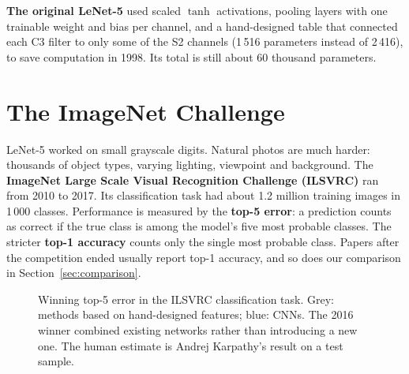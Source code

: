 \documentclass[12pt, a4paper]{article}
\begin{document}
\begin{notebox}
  \textbf{The original LeNet-5} used scaled $\tanh$ activations, pooling
  layers with one trainable weight and bias per channel, and a hand-designed
  table that connected each C3 filter to only some of the S2 channels
  (1\,516 parameters instead of 2\,416), to save computation in 1998.
  Its total is still about 60 thousand parameters.
\end{notebox}

\section{The ImageNet Challenge}

LeNet-5 worked on small grayscale digits. Natural photos are much harder:
thousands of object types, varying lighting, viewpoint and background.
The \textbf{ImageNet Large Scale Visual Recognition Challenge (ILSVRC)} ran
from 2010 to 2017. Its classification task had about 1.2 million training
images in 1\,000 classes. Performance is measured by the \textbf{top-5 error}:
a prediction counts as correct if the true class is among the model's five
most probable classes. The stricter \textbf{top-1 accuracy} counts only the
single most probable class. Papers after the competition ended usually report
top-1 accuracy, and so does our comparison in Section~\ref{sec:comparison}.

\begin{figure}[H]
  \centering
  \caption{Winning top-5 error in the ILSVRC classification task. Grey: methods
    based on hand-designed features; blue: CNNs. The 2016 winner combined
    existing networks rather than introducing a new one. The human estimate is
    Andrej Karpathy's result on a test sample.}
  \label{fig:ilsvrc}
\end{figure}
\end{document}
